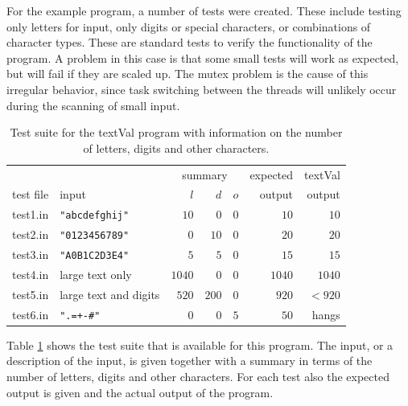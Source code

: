 	For the example program, a number of tests were created. 
	These include testing only letters for input, 
	only digits or special characters, or combinations of character types.
	These are standard tests to verify the functionality of the program.
	A problem in this case is that some small tests will work as expected,
	but will fail if they are scaled up.
	The mutex problem is the cause of this irregular behavior, 
	since task switching between the threads will unlikely occur 
	during the scanning of small input.
	
	\begin{table}
		\begin{center}
		\begin{tabular}{l|l|r r r|r|r}
			\hline
			          &       & \multicolumn{3}{c|}{summary} & expected & textVal \\
			test file & input & $l$ & $d$ & $o$ & output & output \\
			\hline
			test1.in & \verb|"abcdefghij"|   & $10$   & $0$   & $0$ & $10$   & $10$ \\
			test2.in & \verb|"0123456789"|   & $0$    & $10$  & $0$ & $20$   & $20$ \\
			test3.in & \verb|"A0B1C2D3E4"|   & $5$    & $5$   & $0$ & $15$   & $15$ \\
			test4.in & large text only       & $1040$ & $0$   & $0$ & $1040$ & $1040$ \\
			test5.in & large text and digits & $520$  & $200$ & $0$ & $920$  & $< 920$ \\
			test6.in & \verb|".=+-#"|        & $0$    & $0$   & $5$ & $50$   & hangs \\
		\end{tabular}
		\end{center}
		\caption{Test suite for the textVal program with information on the number of 
		letters, digits and other characters.}
		\label{t:TestSuite}
	\end{table}
	
	Table \ref{t:TestSuite} shows the test suite that is available for this program.
	The input, or a description of the input, is given 
	together with a summary in terms of the number of letters, digits and other characters.
	For each test also the expected output is given and the actual output of the program.
	
